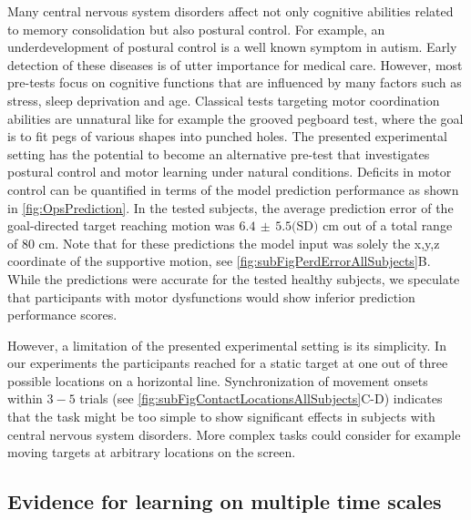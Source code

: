 Many central nervous system disorders affect not only cognitive abilities 
related to memory consolidation but also postural control.  For example, an 
underdevelopment of postural control is a well known symptom in 
autism\cite{schmitz2003motor, minshew2004underdevelopment}. Early detection of 
these diseases is of utter importance for medical care. However, most pre-tests 
focus on cognitive functions that are influenced by many factors such as stress, 
sleep deprivation and age. Classical tests targeting motor coordination 
abilities are unnatural like for example the grooved pegboard 
test\cite{klove1963clinical}, where the goal is to fit pegs of various shapes 
into punched holes. The presented experimental setting has the 
potential to become an alternative pre-test that investigates postural control 
and motor learning under natural conditions. Deficits in motor control can be 
quantified in terms of the model prediction performance as shown in \FigureAbbr 
\ref{fig:OpsPrediction}. In the tested subjects, the average prediction error of the 
goal-directed target reaching motion was $6.4 \, \pm \, 5.5 \textrm{(SD)}$ cm out of a total range of 
$80$ cm. Note that for these predictions the model input was solely the x,y,z coordinate of 
the supportive motion, see \FigureAbbr \ref{fig:subFigPerdErrorAllSubjects}B. 
While the predictions were accurate for the tested healthy subjects, we speculate that 
participants with motor dysfunctions would show inferior prediction performance scores. 

However, a limitation of the presented experimental setting is its simplicity. 
In our experiments the participants reached for a static target at one out of three possible locations  
on a horizontal line. Synchronization of movement onsets within $3-5$ trials (see \FigureAbbr \ref{fig:subFigContactLocationsAllSubjects}C-D) 
indicates that the task might be too simple to show significant effects in subjects 
with central nervous system disorders. More complex tasks could consider for example moving 
targets at arbitrary locations on the screen. 

\subsection*{Evidence for learning on multiple time scales}

